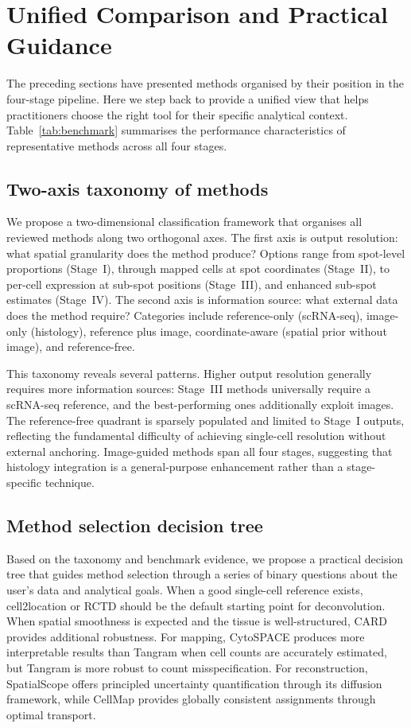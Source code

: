 \section{Unified Comparison and Practical Guidance}
\label{sec:comparison}

The preceding sections have presented methods organised by their position in the four-stage pipeline. Here we step back to provide a unified view that helps practitioners choose the right tool for their specific analytical context. Table~\ref{tab:benchmark} summarises the performance characteristics of representative methods across all four stages.

\subsection{Two-axis taxonomy of methods}

We propose a two-dimensional classification framework that organises all reviewed methods along two orthogonal axes. The first axis is output resolution: what spatial granularity does the method produce? Options range from spot-level proportions (Stage~I), through mapped cells at spot coordinates (Stage~II), to per-cell expression at sub-spot positions (Stage~III), and enhanced sub-spot estimates (Stage~IV). The second axis is information source: what external data does the method require? Categories include reference-only (scRNA-seq), image-only (histology), reference plus image, coordinate-aware (spatial prior without image), and reference-free.

This taxonomy reveals several patterns. Higher output resolution generally requires more information sources: Stage~III methods universally require a scRNA-seq reference, and the best-performing ones additionally exploit images. The reference-free quadrant is sparsely populated and limited to Stage~I outputs, reflecting the fundamental difficulty of achieving single-cell resolution without external anchoring. Image-guided methods span all four stages, suggesting that histology integration is a general-purpose enhancement rather than a stage-specific technique.

\subsection{Method selection decision tree}

Based on the taxonomy and benchmark evidence, we propose a practical decision tree that guides method selection through a series of binary questions about the user's data and analytical goals. When a good single-cell reference exists, cell2location or RCTD should be the default starting point for deconvolution. When spatial smoothness is expected and the tissue is well-structured, CARD provides additional robustness. For mapping, CytoSPACE produces more interpretable results than Tangram when cell counts are accurately estimated, but Tangram is more robust to count misspecification. For reconstruction, SpatialScope offers principled uncertainty quantification through its diffusion framework, while CellMap provides globally consistent assignments through optimal transport.

